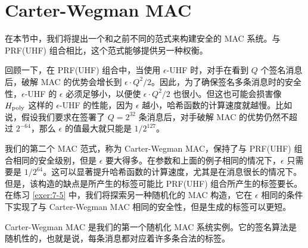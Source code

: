 \section{Carter-Wegman MAC}\label{sec:7-4}

在本节中，我们将提出一个和之前不同的范式来构建安全的 MAC 系统。与 PRF(UHF) 组合相比，这个范式能够提供另一种权衡。

回顾一下，在 PRF(UHF) 组合中，当使用 $\epsilon$-UHF 时，对手在看到 $Q$ 个签名消息后，破解 MAC 的优势会增长到 $\epsilon\cdot{Q^2}/{2}$。因此，为了确保签名多条消息时的安全性，$\epsilon$-UHF 的 $\epsilon$ 必须足够小，以便使 $\epsilon\cdot{Q^2}/{2}$ 也很小。但这也可能会损害像 $H_{\rm poly}$ 这样的 $\epsilon$-UHF 的性能，因为 $\epsilon$ 越小，哈希函数的计算速度就越慢。比如说，假设我们要求在签署了 $Q=2^{32}$ 条消息后，对手破解 MAC 的优势仍然不超过 $2^{-64}$，那么 $\epsilon$ 的值最大就只能是 ${1}/{2^{127}}$。

我们的第二个 MAC 范式，称为 Carter-Wegman MAC，保持了与 PRF(UHF) 组合相同的安全级别，但是 $\epsilon$ 要大得多。在参数和上面的例子相同的情况下，$\epsilon$ 只需要是 ${1}/{2^{64}}$。这可以显著提升哈希函数的计算速度，尤其是在消息很长的情况下。但是，该构造的缺点是所产生的标签可能比 PRF(UHF) 组合所产生的标签要长。在练习 \ref{exer:7-5} 中，我们将探索另一种随机化的 MAC 构造，它在 $\epsilon$ 相同的条件下实现了与 Carter-Wegman MAC 相同的安全性，但是生成的标签可以更短。

Carter-Wegman MAC 是我们的第一个随机化 MAC 系统实例。它的签名算法是随机性的，也就是说，每条消息都对应着许多条合法的标签。

\vspace{5pt}

